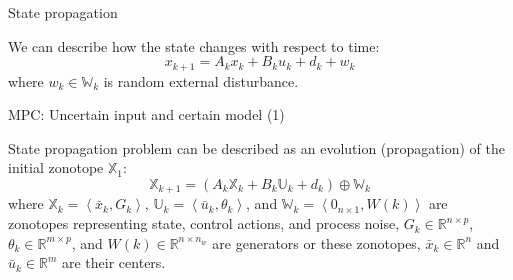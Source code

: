 \documentclass{beamer}
\newcommand{\Zo}[2] {\left\langle {#1},{#2}
	\right\rangle}
\begin{document}
\begin{frame}{State propagation}
	\begin{flushleft}
		
		We can describe how the state changes with respect to time:
		\begin{equation}
			x_{k+1}  = A_k x_k + B_k u_k + d_k + w_k
		\end{equation}
		where $w_k \in \mathbb{W}_k$ is random external disturbance.
		
	\end{flushleft}
\end{frame}





\begin{frame}{MPC: Uncertain input and certain model (1)}
	\begin{flushleft}
		
		State propagation problem can be described as an evolution (propagation) of the initial zonotope $\mathbb{X}_1$:
		\begin{equation}
			\label{eq:LTV_zonotopes}
				\mathbb{X}_{k+1}  = (A_k \mathbb{X}_k + B_k \mathbb{U}_k + d_k) \oplus \mathbb{W}_k
		\end{equation}
		where 
		$\mathbb{X}_k = \Zo{\bar{x}_k}{G_k}$, 
		$\mathbb{U}_k = \Zo{\bar{u}_k}{\theta_k}$, 
		and 
		$\mathbb{W}_k = \Zo{0_{n \times 1}}{W(k)}$ are zonotopes representing state, control actions, and process noise, 
		$G_k      \in \mathbb{R}^{n \times p}$, 
		$\theta_k \in \mathbb{R}^{m \times p}$, and 
		$W(k)      \in \mathbb{R}^{n \times n_w}$ are generators or these zonotopes, 
		$\bar{x}_k      \in \mathbb{R}^{n}$ and 
		$\bar{u}_k \in \mathbb{R}^{m}$ 
		are their centers.  
		
		
	\end{flushleft}
\end{frame}
\end{document}
